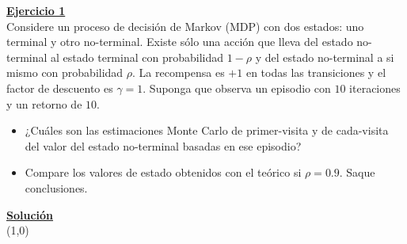 \indent\underline{\textbf{Ejercicio 1}}\\
Considere un proceso de decisión de Markov (MDP) con dos estados: uno terminal y otro no-terminal.
Existe sólo una acción que lleva del estado no-terminal al estado terminal con probabilidad $1 - \rho$ y del estado no-terminal a si mismo con probabilidad $\rho$.
La recompensa es $+1$ en todas las transiciones y el
factor de descuento es $\gamma = 1$.
Suponga que observa un episodio con $10$ iteraciones y un retorno de $10$.

\begin{itemize}
    \item ¿Cuáles son las estimaciones Monte Carlo de primer-visita y de cada-visita del valor del estado no-terminal basadas en ese episodio?
    \item Compare los valores de estado obtenidos con el teórico si $\rho = 0.9$.
    Saque conclusiones.
\end{itemize}

\indent\underline{\textbf{Solución}}\\

\line(1,0){\textwidth}
